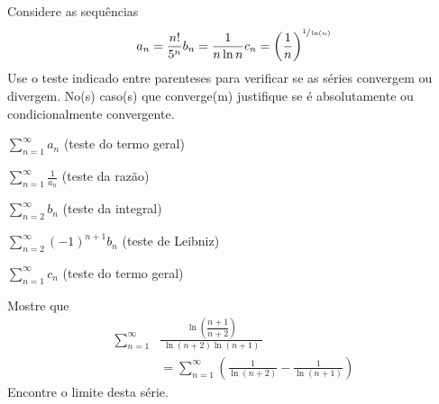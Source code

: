 \begin{exercises*}
\begin{exercise}
  Considere as sequências
  \[
    a_n = \frac{n!}{5^n}    \hfill
    b_n = \frac{1}{n\ln n}  \hfill
    c_n = \left(\frac{1}{n}\right)^{\sfrac{1}{\ln(n)}} \hfill
  \]
  Use o teste indicado entre parenteses para verificar se as séries convergem ou divergem.
  No(s) caso(s) que converge(m) justifique se é absolutamente ou condicionalmente convergente.
  \begin{alphalist}
    \item \(\sum_{n=1}^\infty a_n\)           \tabto{35mm}(teste do termo geral)
    \item \(\sum_{n=1}^\infty\frac{1}{a_n}\)  \tabto{35mm}(teste da razão)
    \item \(\sum_{n=2}^\infty b_n\)           \tabto{35mm}(teste da integral)
    \item \(\sum_{n=2}^\infty (-1)^{n+1}b_n\) \tabto{35mm}(teste de Leibniz)
    \item \(\sum_{n=1}^\infty c_n\)           \tabto{35mm}(teste do termo geral)
  \end{alphalist}
\end{exercise}

\begin{exercise}
  Mostre que
  \begin{align*}
    \sum_{n=1}^\infty & \frac{\ln\left(\dfrac{n+1}{n+2}\right)}{\;\ln(n+2)\ln(n+1)\;}          \\
                      & = \sum_{n=1}^\infty \left(\frac{1}{\ln(n+2)}-\frac{1}{\ln(n+1)}\right)
  \end{align*}
  Encontre o limite desta série.
\end{exercise}


\end{exercises*}
